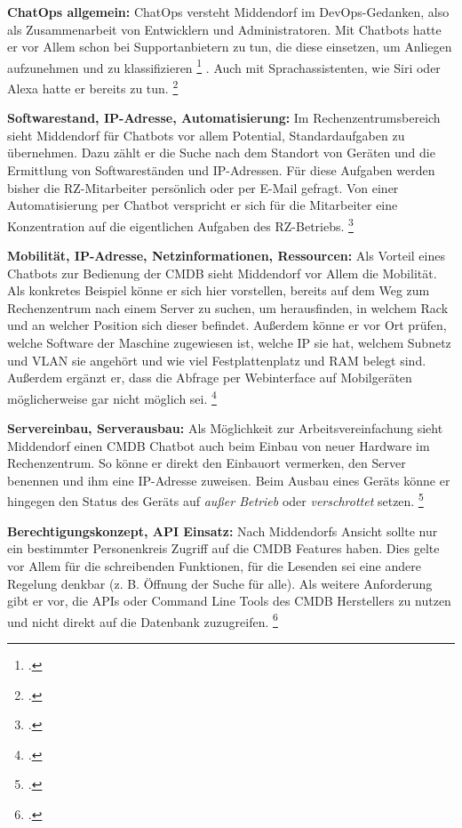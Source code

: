 \textbf{ChatOps allgemein: }ChatOps versteht Middendorf im DevOps-Gedanken, also als Zusammenarbeit von Entwicklern und Administratoren.
Mit Chatbots hatte er vor Allem schon bei Supportanbietern zu tun, die diese einsetzen, um \glqq{}Anliegen aufzunehmen und zu klassifizieren\grqq
\footcite[][o. \pno]{Midd_2019}
.
Auch mit Sprachassistenten, wie Siri oder Alexa hatte er bereits zu tun.
\footcite[Vgl.][o. \pno]{Midd_2019}

\textbf{Softwarestand, IP-Adresse, Automatisierung: }Im Rechenzentrumsbereich sieht Middendorf für Chatbots vor allem Potential, Standardaufgaben zu übernehmen. Dazu zählt er die Suche nach dem Standort von Geräten und die Ermittlung von Softwareständen und IP-Adressen. Für diese Aufgaben werden bisher die RZ-Mitarbeiter persönlich oder per E-Mail gefragt. Von einer Automatisierung per Chatbot verspricht er sich für die Mitarbeiter eine Konzentration auf die eigentlichen Aufgaben des RZ-Betriebs.
\footcite[Vgl.][o. \pno]{Midd_2019}

\textbf{Mobilität, IP-Adresse, Netzinformationen, Ressourcen: }Als Vorteil eines Chatbots zur Bedienung der \acs{CMDB} sieht Middendorf vor Allem die Mobilität. Als konkretes Beispiel könne er sich hier vorstellen, bereits auf dem Weg zum Rechenzentrum nach einem Server zu suchen, um herausfinden, in welchem Rack und an welcher Position sich dieser befindet. Außerdem könne er vor Ort prüfen, welche Software der Maschine zugewiesen ist, welche IP sie hat, welchem Subnetz und VLAN sie angehört und wie viel Festplattenplatz und RAM belegt sind.
Außerdem ergänzt er, dass die Abfrage per Webinterface auf Mobilgeräten möglicherweise gar nicht möglich sei.
\footcite[Vgl.][o. \pno]{Midd_2019}

\textbf{Servereinbau, Serverausbau: }Als Möglichkeit zur Arbeitsvereinfachung sieht Middendorf einen \acs{CMDB} Chatbot auch beim Einbau von neuer Hardware im Rechenzentrum. So könne er direkt den Einbauort vermerken, den Server benennen und ihm eine IP-Adresse zuweisen. Beim Ausbau eines Geräts könne er hingegen den Status des Geräts auf \textit{außer Betrieb} oder \textit{verschrottet} setzen.
\footcite[Vgl.][o. \pno]{Midd_2019}

\textbf{Berechtigungskonzept, API Einsatz: }Nach Middendorfs Ansicht sollte nur ein bestimmter Personenkreis Zugriff auf die \acs{CMDB} Features haben. Dies gelte vor Allem für die schreibenden Funktionen, für die Lesenden sei eine andere Regelung denkbar (z. B. Öffnung der Suche für alle).
Als weitere Anforderung gibt er vor, die \acsp{API} oder Command Line Tools des \acs{CMDB} Herstellers zu nutzen und nicht direkt auf die Datenbank zuzugreifen.
\footcite[Vgl.][o. \pno]{Midd_2019}

